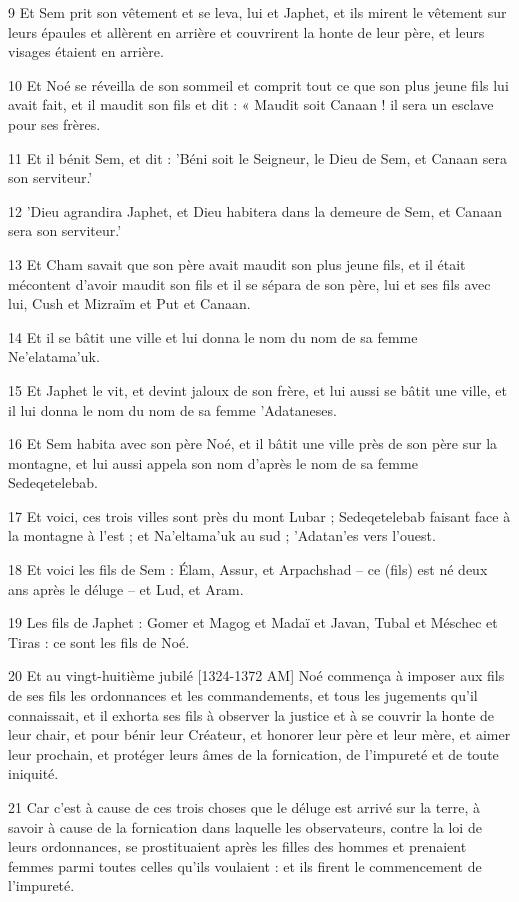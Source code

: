 \par 9 Et Sem prit son vêtement et se leva, lui et Japhet, et ils mirent le vêtement sur leurs épaules et allèrent en arrière et couvrirent la honte de leur père, et leurs visages étaient en arrière.
\par 10 Et Noé se réveilla de son sommeil et comprit tout ce que son plus jeune fils lui avait fait, et il maudit son fils et dit : « Maudit soit Canaan ! il sera un esclave pour ses frères.
\par 11 Et il bénit Sem, et dit : 'Béni soit le Seigneur, le Dieu de Sem, et Canaan sera son serviteur.'
\par 12 'Dieu agrandira Japhet, et Dieu habitera dans la demeure de Sem, et Canaan sera son serviteur.'
\par 13 Et Cham savait que son père avait maudit son plus jeune fils, et il était mécontent d'avoir maudit son fils et il se sépara de son père, lui et ses fils avec lui, Cush et Mizraïm et Put et Canaan.
\par 14 Et il se bâtit une ville et lui donna le nom du nom de sa femme Ne'elatama'uk.
\par 15 Et Japhet le vit, et devint jaloux de son frère, et lui aussi se bâtit une ville, et il lui donna le nom du nom de sa femme 'Adataneses.
\par 16 Et Sem habita avec son père Noé, et il bâtit une ville près de son père sur la montagne, et lui aussi appela son nom d'après le nom de sa femme Sedeqetelebab.
\par 17 Et voici, ces trois villes sont près du mont Lubar ; Sedeqetelebab faisant face à la montagne à l'est ; et Na'eltama'uk au sud ; 'Adatan'es vers l'ouest.
\par 18 Et voici les fils de Sem : Élam, Assur, et Arpachshad – ce (fils) est né deux ans après le déluge – et Lud, et Aram.
\par 19 Les fils de Japhet : Gomer et Magog et Madaï et Javan, Tubal et Méschec et Tiras : ce sont les fils de Noé.
\par 20 Et au vingt-huitième jubilé [1324-1372 AM] Noé commença à imposer aux fils de ses fils les ordonnances et les commandements, et tous les jugements qu'il connaissait, et il exhorta ses fils à observer la justice et à se couvrir la honte de leur chair, et pour bénir leur Créateur, et honorer leur père et leur mère, et aimer leur prochain, et protéger leurs âmes de la fornication, de l'impureté et de toute iniquité.
\par 21 Car c'est à cause de ces trois choses que le déluge est arrivé sur la terre, à savoir à cause de la fornication dans laquelle les observateurs, contre la loi de leurs ordonnances, se prostituaient après les filles des hommes et prenaient femmes parmi toutes celles qu'ils voulaient : et ils firent le commencement de l'impureté.
